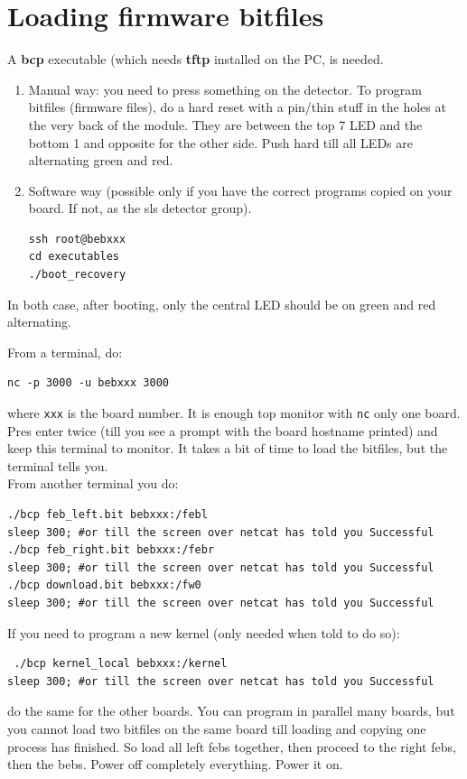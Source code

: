 \documentclass{article}
\begin{document}
\section{Loading firmware bitfiles}

A \textbf{bcp} executable (which needs \textbf{tftp} installed on the PC, is needed. 
\begin{enumerate}
\item Manual way: you need to press something on the detector. To program bitfiles (firmware files), do a hard reset with a pin/thin stuff in the holes at the very back of the module. They are between the top 7 LED and the bottom 1 and opposite for the other side. Push hard till all LEDs are alternating green and red.
\item Software way (possible only if you have the correct programs copied on your board. If not, as the sls detector group). 
\begin{verbatim}
ssh root@bebxxx
cd executables
./boot_recovery 
 \end{verbatim} 
\end{enumerate}
In both case, after booting, only the central LED should be on green and red alternating. 

From a terminal, do:
\begin{verbatim}
nc -p 3000 -u bebxxx 3000 
\end{verbatim} 
where {\tt{xxx}} is the board number. It is enough top monitor with {\tt{nc}} only one board. Pres enter twice (till you see a prompt with the board hostname printed) and keep this terminal to monitor. It takes a bit of time to load the bitfiles, but the terminal tells you.\\
From another terminal you do:
\begin{verbatim}
./bcp feb_left.bit bebxxx:/febl
sleep 300; #or till the screen over netcat has told you Successful
./bcp feb_right.bit bebxxx:/febr
sleep 300; #or till the screen over netcat has told you Successful
./bcp download.bit bebxxx:/fw0
sleep 300; #or till the screen over netcat has told you Successful
\end{verbatim}
If you need to program a new kernel (only needed when told to do so):
\begin{verbatim}
 ./bcp kernel_local bebxxx:/kernel
sleep 300; #or till the screen over netcat has told you Successful
\end{verbatim}
do the same for the other boards. You can program in parallel many boards, but you cannot load two bitfiles on the same board till loading and copying one process has finished. So load all left febs together, then proceed to the right febs, then the bebs. Power off completely everything. Power it on.
\end{document}
